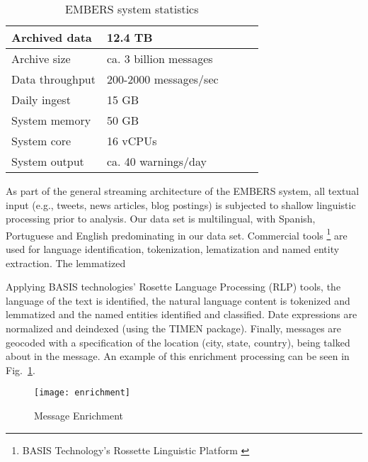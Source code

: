 
\begin{table}
\caption{EMBERS system statistics}
 \centering
 \begin{tabular}{|l|l|l|l|l|}
 \hline
 Archived data     & 12.4 TB                  \\ \hline
 Archive size & ca. 3 billion messages   \\ \hline
 Data throughput   & 200-2000 messages/sec  \\ \hline
 Daily ingest & 15 GB \\ \hline
 System memory & 50 GB \\ \hline
 System core & 16 vCPUs \\ \hline
 System output & ca. 40 warnings/day \\ \hline
\end{tabular}
\label{tab:stats}
\end{table}




As part of the general streaming architecture of the EMBERS system,
all textual input (e.g., tweets, news articles, blog postings) is
subjected to shallow linguistic processing prior to analysis.  Our
data set is multilingual, with Spanish, Portuguese and English
predominating in our data set. Commercial tools \footnote{BASIS
  Technology's Rossette Linguistic Platform \cite{}} are used for language
identification, tokenization, lematization and named entity
extraction. The lemmatized

Applying BASIS
technologies' Rosette Language Processing (RLP) tools, the language of
the text is identified, the natural language content is tokenized and
lemmatized and the named entities identified and classified. Date
expressions are normalized and deindexed (using the TIMEN
\cite{LlorensDGS12} package).  Finally, messages are geocoded with a
specification of the location (city, state, country), being talked
about in the message.  An example of this enrichment processing can be
seen in Fig.~\ref{fig:enrichment}.

\begin{figure}
    \texttt{[image: enrichment]}
    \caption{Message Enrichment}
    \label{fig:enrichment}
\end{figure}



